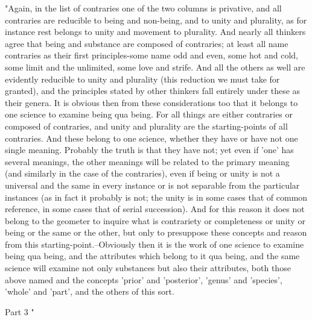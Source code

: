 "Again, in the list of contraries one of the two columns is privative,
and all contraries are reducible to being and non-being, and to unity
and plurality, as for instance rest belongs to unity and movement
to plurality. And nearly all thinkers agree that being and substance
are composed of contraries; at least all name contraries as their
first principles-some name odd and even, some hot and cold, some limit
and the unlimited, some love and strife. And all the others as well
are evidently reducible to unity and plurality (this reduction we
must take for granted), and the principles stated by other thinkers
fall entirely under these as their genera. It is obvious then from
these considerations too that it belongs to one science to examine
being qua being. For all things are either contraries or composed
of contraries, and unity and plurality are the starting-points of
all contraries. And these belong to one science, whether they have
or have not one single meaning. Probably the truth is that they have
not; yet even if 'one' has several meanings, the other meanings will
be related to the primary meaning (and similarly in the case of the
contraries), even if being or unity is not a universal and the same
in every instance or is not separable from the particular instances
(as in fact it probably is not; the unity is in some cases that of
common reference, in some cases that of serial succession). And for
this reason it does not belong to the geometer to inquire what is
contrariety or completeness or unity or being or the same or the other,
but only to presuppose these concepts and reason from this starting-point.--Obviously
then it is the work of one science to examine being qua being, and
the attributes which belong to it qua being, and the same science
will examine not only substances but also their attributes, both those
above named and the concepts 'prior' and 'posterior', 'genus' and
'species', 'whole' and 'part', and the others of this sort.

Part 3 "

